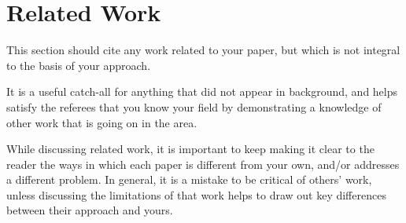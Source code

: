 \section{Related Work}
\label{sec:related-work}

This section should cite any work related to your paper,
but which is not integral to the basis of your approach.

It is a useful catch-all for anything that did not appear
in background, and helps satisfy the referees that you
know your field by demonstrating a knowledge of other
work that is going on in the area.

While discussing related work, it is important to keep
making it clear to the reader the ways in which each paper
is different from your own, and/or addresses a different
problem. In general, it is a mistake to be critical of
others' work, unless discussing the limitations of that
work helps to draw out key differences between their
approach and yours.
